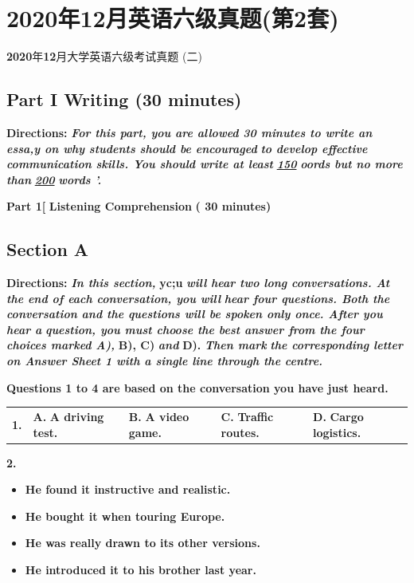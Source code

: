 \documentclass[UTF8,11pt]{ctexart}
\begin{document}
\section*{2020年12月英语六级真题(第2套)}
\textbf{2020}年\textbf{12}月大学英语六级考试真题 (二)


\subsection*{\textbf{Part }I \textbf{Writing} \textbf{(30 minutes)}}


\textbf{Directions: }\textbf{\textit{For this part, you are allowed 30 minutes to write an essa,y on why students should be encouraged}} \textbf{\textit{to develop effective communication skills. You should write at least }}\textbf{\textit{\uline{150}}}\textbf{\textit{ oords but no more than }}\textbf{\textit{\uline{200}}}\textbf{\textit{ words '.}}


\textbf{Part 1[} \textbf{Listening Comprehension} \textbf{( 30 minutes)}


\subsection*{\textbf{Section A}}


\textbf{Directions: }\textbf{\textit{In \textperiodcentered{}this section, }}\textbf{yc;u }\textbf{\textit{will hear two long conversations. At the end of each conversation, you will}} \textbf{\textit{hear four questions. Both the conversation and the questions will be spoken only once. After you hear a}} \textbf{\textit{question, you must choose the best answer from the four choices marked A), }}\textbf{B), C) }\textbf{\textit{and }}\textbf{D). }\textbf{\textit{Then mark}} \textbf{\textit{the corresponding letter on Answer Sheet 1 with a single line through the centre.}}


\textbf{Questions 1 to 4 are based on the conversation you have just heard.}


\noindent\begin{tabularx}{\linewidth}{@{}lXXXX@{}}\textbf{1.} & \textbf{A.} \textbf{A driving test.} & \textbf{B.} \textbf{A video game.} & \textbf{C.} \textbf{Traffic routes.} & \textbf{D.} \textbf{Cargo logistics.}\\\end{tabularx}\par

\textbf{2.}


\begin{itemize}[leftmargin=2em,itemsep=.2em,topsep=.4em]\item[A.] \textbf{He found it instructive and realistic.}
\item[B.] \textbf{He bought it when touring Europe.}
\item[C.] \textbf{He was really drawn to its other versions.}
\item[D.] \textbf{He introduced it to his brother last year.}
\end{itemize}
\end{document}
